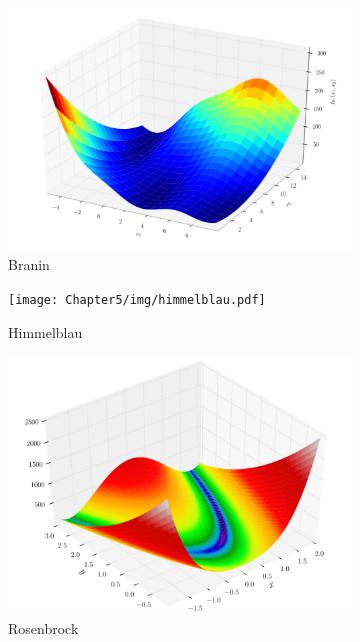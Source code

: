 \begin{figure}[ht]
  \centering
  \begin{subfigure}{0.24\textwidth}
    \centering\includegraphics[width=\textwidth]{Chapter5/img/branin.pdf}
    \caption{Branin}
  \end{subfigure}
  \begin{subfigure}{0.24\textwidth}
    \centering\texttt{[image: Chapter5/img/himmelblau.pdf]}
    \caption{Himmelblau}
  \end{subfigure}
  \begin{subfigure}{0.24\textwidth}
    \centering\includegraphics[width=\textwidth]{Chapter5/img/rosenbrock.pdf}
    \caption{Rosenbrock}
  \end{subfigure}
  \begin{subfigure}{0.24\textwidth}

\end{subfigure}
\end{figure}
